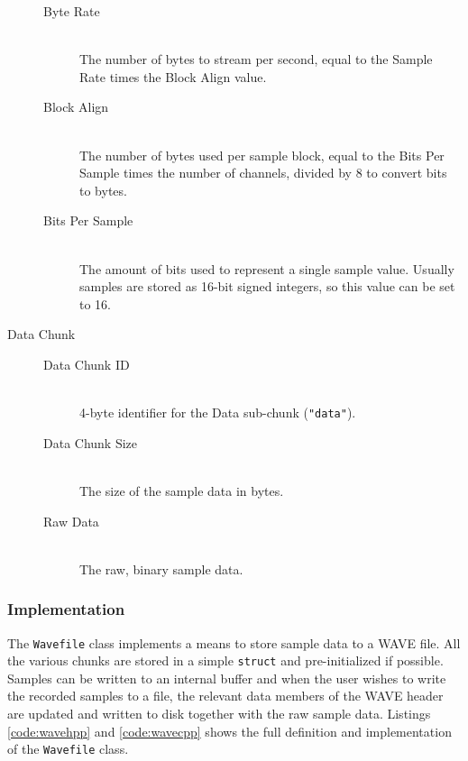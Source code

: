\begin{description}
\begin{description}
    \item[Byte Rate] \hfill \\ The number of bytes to stream per second, equal to the Sample Rate times the Block Align value.

    \item[Block Align] \hfill \\ The number of bytes used per sample block, equal to the Bits Per Sample times the number of channels, divided by 8 to convert bits to bytes.

    \item[Bits Per Sample] \hfill \\ The amount of bits used to represent a single sample value. Usually samples are stored as 16-bit signed integers, so this value can be set to 16.

  \end{description}

  \item[Data Chunk] \hfill

  \begin{description}

    \item[Data Chunk ID] \hfill \\ 4-byte identifier for the Data sub-chunk (\texttt{"data"}).

    \item[Data Chunk Size] \hfill \\ The size of the sample data in bytes.

    \item[Raw Data] \hfill \\ The raw, binary sample data.

  \end{description}

\end{description}

\subsubsection{Implementation}

The \texttt{Wavefile} class implements a means to store sample data to a WAVE file. All the various chunks are stored in a simple \texttt{struct} and pre-initialized if possible. Samples can be written to an internal buffer and when the user wishes to write the recorded samples to a file, the relevant data members of the WAVE header are updated and written to disk together with the raw sample data. Listings \ref{code:wavehpp} and \ref{code:wavecpp} shows the full definition and implementation of the \texttt{Wavefile} class.


